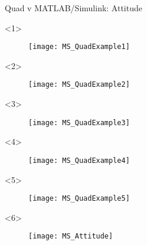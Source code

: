 \begin{frame}{Quad v MATLAB/Simulink: Attitude}
\begin{onlyenv}<1>
  \begin{figure}
\centering
\texttt{[image: MS\_QuadExample1]}\\
\end{figure}
\end{onlyenv}

\begin{onlyenv}<2>
\begin{figure}
\centering
\texttt{[image: MS\_QuadExample2]}\\
\end{figure}
\end{onlyenv}

\begin{onlyenv}<3>
\begin{figure}
\centering
\texttt{[image: MS\_QuadExample3]}\\
\end{figure}
\end{onlyenv}


\begin{onlyenv}<4>
\begin{figure}
\centering
\texttt{[image: MS\_QuadExample4]}\\
\end{figure}
\end{onlyenv}

\begin{onlyenv}<5>
\begin{figure}
\centering
\texttt{[image: MS\_QuadExample5]}\\
\end{figure}
\end{onlyenv}


\begin{onlyenv}<6>
\begin{figure}
\centering
\texttt{[image: MS\_Attitude]}\\
\end{figure}
\end{onlyenv}

\end{frame}


